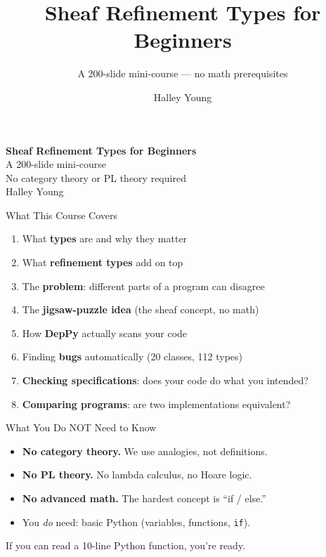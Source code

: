 \documentclass[aspectratio=169,10pt]{beamer}
\title{\textbf{Sheaf Refinement Types for Beginners}}
\subtitle{A 200-slide mini-course --- no math prerequisites}
\author{Halley Young}\date{}
\newcommand{\hint}[1]{\begin{center}
  \colorbox{hintbg}{\parbox{0.88\textwidth}{\centering\small #1}}\end{center}}
\begin{document}
\begin{frame}[plain]
\vfill
{\Large\bfseries Sheaf Refinement Types for Beginners}\\[0.4em]
{\normalsize A 200-slide mini-course}\\[0.3em]
{\normalsize No category theory or PL theory required}\\[1em]
{\normalsize Halley Young}
\vfill
\end{frame}

\begin{frame}{What This Course Covers}
\begin{enumerate}
  \item What \textbf{types} are and why they matter
  \item What \textbf{refinement types} add on top
  \item The \textbf{problem}: different parts of a program can disagree
  \item The \textbf{jigsaw-puzzle idea} (the sheaf concept, no math)
  \item How \textbf{DepPy} actually scans your code
  \item Finding \textbf{bugs} automatically (20 classes, 112 types)
  \item \textbf{Checking specifications}: does your code do what you intended?
  \item \textbf{Comparing programs}: are two implementations equivalent?
\end{enumerate}
\end{frame}

\begin{frame}{What You Do NOT Need to Know}
\begin{itemize}
  \item \textbf{No category theory.} We use analogies, not definitions.
  \item \textbf{No PL theory.} No lambda calculus, no Hoare logic.
  \item \textbf{No advanced math.} The hardest concept is ``if / else.''
  \item You \emph{do} need: basic Python (variables, functions, \texttt{if}).
\end{itemize}
\hint{If you can read a 10-line Python function, you're ready.}
\end{frame}
\end{document}
